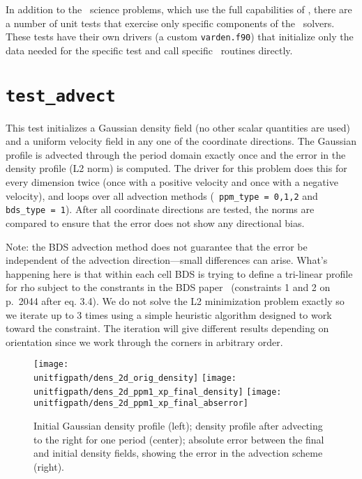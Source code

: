 
\label{chapter:unit_tests}

In addition to the \maestro\ science problems, which use the full
capabilities of \maestro, there are a number of unit tests that
exercise only specific components of the \maestro\ solvers.  These
tests have their own drivers (a custom {\tt varden.f90}) that
initialize only the data needed for the specific test and call
specific \maestro\ routines directly.


\section {\tt test\_advect}

  This test initializes a Gaussian density field (no other scalar
  quantities are used) and a uniform velocity field in any one of the
  coordinate directions.  The Gaussian profile is advected through the
  period domain exactly once and the error in the density profile (L2
  norm) is computed.  The driver for this problem does this for every
  dimension twice (once with a positive velocity and once with a
  negative velocity), and loops over all advection methods ({\tt
  ppm\_type = 0,1,2} and {\tt bds\_type = 1}).  After all coordinate
  directions are tested, the norms are compared to ensure that the
  error does not show any directional bias.

  Note: the BDS advection method does not guarantee that the error be
  independent of the advection direction---small differences can
  arise.  What's happening here is that within each cell BDS is trying
  to define a tri-linear profile for rho subject to the constrants in
  the BDS paper~\cite{bds3d} (constraints 1 and 2 on p.\ 2044 after eq. 3.4).  We
  do not solve the L2 minimization problem exactly so we iterate up to
  3 times using a simple heuristic algorithm designed to work toward
  the constraint.  The iteration will give different results depending
  on orientation since we work through the corners in arbitrary order.

\begin{figure}[t] 
\centering
\texttt{[image: \\unitfigpath/dens\_2d\_orig\_density]}
\texttt{[image: \\unitfigpath/dens\_2d\_ppm1\_xp\_final\_density]}
\texttt{[image: \\unitfigpath/dens\_2d\_ppm1\_xp\_final\_abserror]} 
%
\caption[Results of the {\tt test\_advect} unit test]{\label{fig:unit:advtest}
  Initial Gaussian density profile (left); density profile after
  advecting to the right for one period (center); absolute error
  between the final and initial density fields, showing the error in
  the advection scheme (right).}
\end{figure}


